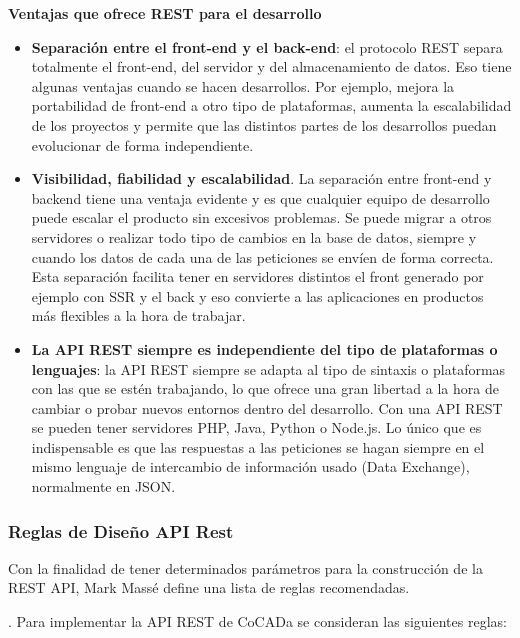 \vspace{5mm}
\textbf{Ventajas que ofrece REST para el desarrollo}
\begin{itemize}
    \item \textbf{Separación entre el front-end y el back-end}: el protocolo REST separa totalmente el front-end, del servidor y del almacenamiento de datos. Eso tiene algunas ventajas cuando se hacen desarrollos. Por ejemplo, mejora la portabilidad de front-end a otro tipo de plataformas, aumenta la escalabilidad de los proyectos y permite que las distintos partes de los desarrollos puedan evolucionar de forma independiente.

    \item  \textbf{Visibilidad, fiabilidad y escalabilidad}. La separación entre front-end y backend tiene una ventaja evidente y es que cualquier equipo de desarrollo puede escalar el producto sin excesivos problemas. Se puede migrar a otros servidores o realizar todo tipo de cambios en la base de datos, siempre y cuando los datos de cada una de las peticiones se envíen de forma correcta. Esta separación facilita tener en servidores distintos el front generado por ejemplo con SSR y el back y eso convierte a las aplicaciones en productos más flexibles a la hora de trabajar.

    \item  \textbf{La API REST siempre es independiente del tipo de plataformas o lenguajes}: la API REST siempre se adapta al tipo de sintaxis o plataformas con las que se estén trabajando, lo que ofrece una gran libertad a la hora de cambiar o probar nuevos entornos dentro del desarrollo. Con una API REST se pueden tener servidores PHP, Java, Python o Node.js. Lo único que es indispensable es que las respuestas a las peticiones se hagan siempre en el mismo lenguaje de intercambio de información usado (Data Exchange), normalmente en JSON.
\end{itemize}


\subsubsection{Reglas de Diseño API Rest}
Con la finalidad de tener determinados parámetros para la construcción de la REST API, Mark Massé\citep{Fallis2013} define una lista de reglas recomendadas.


.
Para implementar la API REST de CoCADa se consideran las siguientes reglas:

